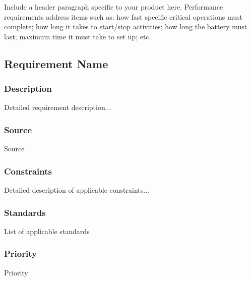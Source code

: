 Include a header paragraph specific to your product here. Performance requirements address items such as: how fast specific critical operations must complete; how long it takes to start/stop activities; how long the battery must last; maximum time it must take to set up; etc.



\subsection{Requirement Name}
\subsubsection{Description}
Detailed requirement description...
\subsubsection{Source}
Source
\subsubsection{Constraints}
Detailed description of applicable constraints...
\subsubsection{Standards}
List of applicable standards
\subsubsection{Priority}
Priority

